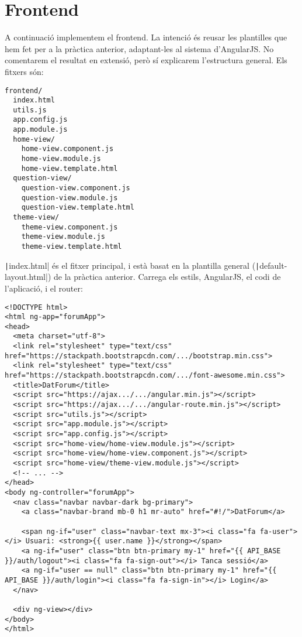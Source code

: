 \documentclass[catalan, a4paper]{scrartcl}
\begin{document}
\section{Frontend}

A continuació implementem el frontend. La intenció és reusar les
plantilles que hem fet per a la pràctica anterior, adaptant-les al
sistema d'AngularJS. No comentarem el resultat en extensió,
però sí explicarem l'estructura general. Els fitxers són:

\begin{verbatim}
frontend/
  index.html
  utils.js
  app.config.js
  app.module.js
  home-view/
    home-view.component.js
    home-view.module.js
    home-view.template.html
  question-view/
    question-view.component.js
    question-view.module.js
    question-view.template.html
  theme-view/
    theme-view.component.js
    theme-view.module.js
    theme-view.template.html
\end{verbatim}

\texttt|index.html| és el fitxer principal, i està basat
en la plantilla general (\texttt|default-layout.html|) de
la pràctica anterior. Carrega els estils, AngularJS, el codi de
l'aplicació, i el router:

\begin{verbatim}
<!DOCTYPE html>
<html ng-app="forumApp">
<head>
  <meta charset="utf-8">
  <link rel="stylesheet" type="text/css" href="https://stackpath.bootstrapcdn.com/.../bootstrap.min.css">
  <link rel="stylesheet" type="text/css" href="https://stackpath.bootstrapcdn.com/.../font-awesome.min.css">
  <title>DatForum</title>
  <script src="https://ajax.../.../angular.min.js"></script>
  <script src="https://ajax.../.../angular-route.min.js"></script>
  <script src="utils.js"></script>
  <script src="app.module.js"></script>
  <script src="app.config.js"></script>
  <script src="home-view/home-view.module.js"></script>
  <script src="home-view/home-view.component.js"></script>
  <script src="home-view/theme-view.module.js"></script>
  <!-- ... -->
</head>
<body ng-controller="forumApp">
  <nav class="navbar navbar-dark bg-primary">
    <a class="navbar-brand mb-0 h1 mr-auto" href="#!/">DatForum</a>

    <span ng-if="user" class="navbar-text mx-3"><i class="fa fa-user"></i> Usuari: <strong>{{ user.name }}</strong></span>
    <a ng-if="user" class="btn btn-primary my-1" href="{{ API_BASE }}/auth/logout"><i class="fa fa-sign-out"></i> Tanca sessió</a>
    <a ng-if="user == null" class="btn btn-primary my-1" href="{{ API_BASE }}/auth/login"><i class="fa fa-sign-in"></i> Login</a>
  </nav>

  <div ng-view></div>
</body>
</html>
\end{verbatim}
\end{document}
